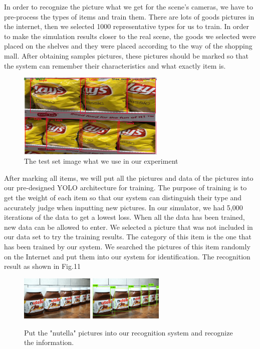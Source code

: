 In order to recognize the picture what we get for the scene's cameras, we have to pre-process the types of items and train them.
There are lots of goods pictures in the internet, then we selected 1000 representative types for us to train.
In order to make the simulation results closer to the real scene, the goods we selected were placed on the shelves and they were placed according to the way of the shopping mall.
After obtaining samples pictures, these pictures should be marked so that the system can remember their characteristics and what exactly item is.

\begin{figure}[htbp]
\centerline{\includegraphics[width=7cm,scale=0.8]{LaysMarked.jpg}}
\caption{The test set image what we use in our experiment}
\label{fig}
\end{figure}

After marking all items, we will put all the pictures and data of the pictures into our pre-designed YOLO architecture for training.
The purpose of training is to get the weight of each item so that our system can distinguish their type and accurately judge when inputting new pictures.
In our simulator, we had 5,000 iterations of the data to get a lowest loss.
When all the data has been trained, new data can be allowed to enter.
We selected a picture that was not included in our data set to try the training results.
The category of this item is the one that has been trained by our system.
We searched the pictures of this item randomly on the Internet and put them into our system for identification.
The recognition result as shown in Fig.11

\begin{figure}[htbp]
\centerline{\includegraphics[width=3.5cm,scale=0.6]{nutella.jpg} \includegraphics[width=3.5cm,scale=0.6]{nutella2.jpg}}
\caption{Put the "nutella" pictures into our recognition system and recognize the information.}
\label{fig}
\end{figure}

